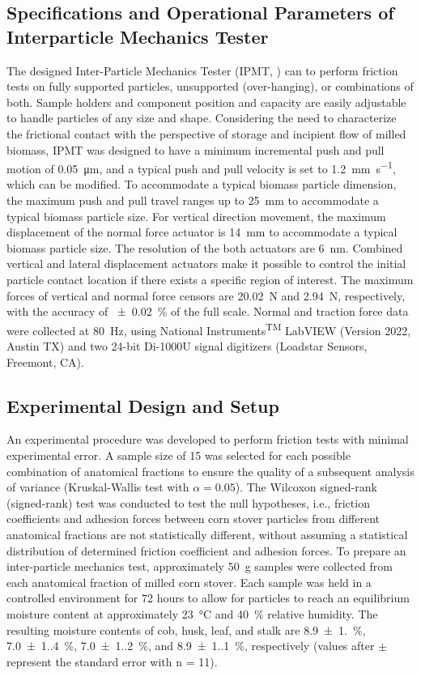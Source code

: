 \documentclass[xcolor=dvipsnames,10pt,hidelinks]{article}
\let\oldsubsection\subsection
\renewcommand{\subsection}{\clearpage\oldsubsection}
\begin{document}
\subsection{Specifications and Operational Parameters of Interparticle Mechanics Tester}
\label{sec:orgde26a81}
The designed Inter-Particle Mechanics Tester (IPMT, \parencite{slosson_characterization_2025}) can to perform friction tests on fully supported particles, unsupported (over-hanging), or combinations of both.
Sample holders and component position and capacity are easily adjustable to handle particles of any size and shape.
Considering the need to characterize the frictional contact with the perspective of storage and incipient flow of milled biomass,
IPMT was designed to have a minimum incremental push and pull motion of \qty{0.05}{\micro\meter},
and a typical push and pull velocity is set to \qty{1.2}{\milli\meter\per\second}, which can be modified.
To accommodate a typical biomass particle dimension,
the maximum push and pull travel ranges up to \qty{25}{\milli\meter} to accommodate a typical biomass particle size.
For vertical direction movement, the maximum displacement of the normal force actuator is \qty{14}{\milli\meter} to accommodate a typical biomass particle size.
The resolution of the both actuators are \qty{6}{\nano\meter}.
Combined vertical and lateral displacement actuators make it possible to control the initial particle contact location if there exists a specific region of interest. The maximum forces of vertical and normal force censors are \qty{20.02}{\newton} and \qty{2.94}{\newton}, respectively,
with the accuracy of \qty{\pm 0.02}{\percent} of the full scale.
Normal and traction force data were collected at \qty{80}{\hertz}, using National Instruments\textsuperscript{TM} LabVIEW (Version 2022, Austin TX) and
two 24-bit Di-1000U signal digitizers (Loadstar Sensors, Freemont, CA).
\subsection{Experimental Design and Setup}
\label{sec:orge48fec6}
An experimental procedure was developed to perform friction tests with minimal experimental error.
A sample size of 15 was selected for each possible combination of anatomical fractions to ensure the quality of a subsequent analysis of variance (Kruskal-Wallis test with \(\alpha=0.05\)).
The Wilcoxon signed-rank (signed-rank) test was conducted to test the null hypotheses,
i.e., friction coefficients and adhesion forces between corn stover particles from different anatomical fractions are not statistically different,
without assuming a statistical distribution of determined friction coefficient and adhesion forces.
To prepare an inter-particle mechanics test, approximately \qty{50}{\gram} samples were collected from each anatomical fraction of milled corn stover.
Each sample was held in a controlled environment for 72 hours to allow for particles to reach an equilibrium moisture content at approximately \qty{23}{\celsius} and \qty{40}{\percent} relative humidity.
The resulting moisture contents of cob, husk, leaf, and stalk are \qty{8.9(1.0)}{\percent}, \qty{7.0(1.4)}{\percent}, \qty{7.0(1.2)}{\percent}, and \qty{8.9(1.1)}{\percent}, respectively (values after \(\pm\) represent the standard error with n = 11).
\end{document}
